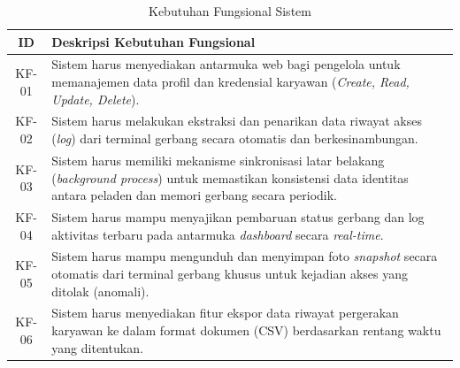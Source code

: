 \begin{table}[htbp]
    \centering
    \caption{Kebutuhan Fungsional Sistem}
    \label{tab:kebutuhan_fungsional_sistem}
    \begin{tabular}{|c|p{12cm}|}
        \hline
        \textbf{ID} & \textbf{Deskripsi Kebutuhan Fungsional} \\
        \hline
        KF-01 & Sistem harus menyediakan antarmuka web bagi pengelola untuk memanajemen data profil dan kredensial karyawan (\textit{Create, Read, Update, Delete}). \\
        \hline
        KF-02 & Sistem harus melakukan ekstraksi dan penarikan data riwayat akses (\textit{log}) dari terminal gerbang secara otomatis dan berkesinambungan. \\
        \hline
        KF-03 & Sistem harus memiliki mekanisme sinkronisasi latar belakang (\textit{background process}) untuk memastikan konsistensi data identitas antara peladen dan memori gerbang secara periodik. \\
        \hline
        KF-04 & Sistem harus mampu menyajikan pembaruan status gerbang dan log aktivitas terbaru pada antarmuka \textit{dashboard} secara \textit{real-time}. \\
        \hline
        KF-05 & Sistem harus mampu mengunduh dan menyimpan foto \textit{snapshot} secara otomatis dari terminal gerbang khusus untuk kejadian akses yang ditolak (anomali). \\
        \hline
        KF-06 & Sistem harus menyediakan fitur ekspor data riwayat pergerakan karyawan ke dalam format dokumen (CSV) berdasarkan rentang waktu yang ditentukan. \\
        \hline
    \end{tabular}
\end{table}